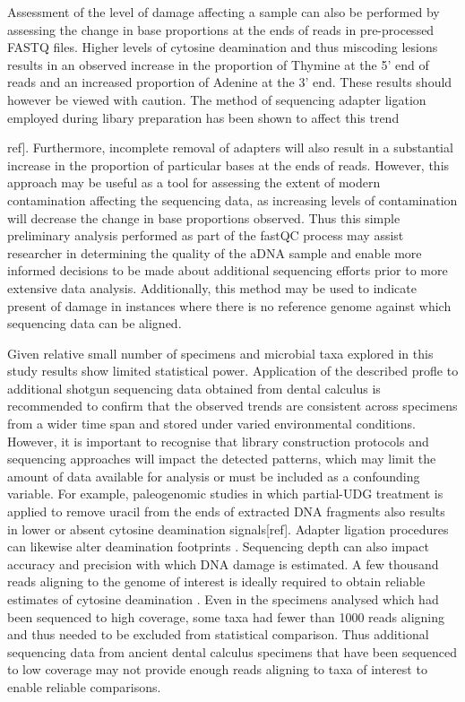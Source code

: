 \documentclass[12pt, a4paper]{article}
\begin{document}
Assessment of the level of damage affecting a sample can also be performed by assessing the change in base proportions at the ends of reads in pre-processed FASTQ files.
Higher levels of cytosine deamination and thus miscoding lesions results in an observed increase in the proportion of Thymine at the 5' end of reads and an increased proportion of Adenine at the 3' end.
These results should however be viewed with caution.
The method of sequencing adapter ligation employed during libary preparation has been shown to affect this trend {ref].
Furthermore, incomplete removal of adapters will also result in a substantial increase in the proportion of particular bases at the ends of reads.
However, this approach may be useful as a tool for assessing the extent of modern contamination affecting the sequencing data, as increasing levels of contamination will decrease the change in base proportions observed.
Thus this simple preliminary analysis performed as part of the fastQC process may assist researcher in determining the quality of the aDNA sample and enable more informed decisions to be made about additional sequencing efforts prior to more extensive data analysis.
Additionally, this method may be used to indicate present of damage in instances where there is no reference genome against which sequencing data can be aligned.

Given relative small number of specimens and microbial taxa explored in this study results show limited statistical power.
Application of the described profle to additional shotgun sequencing data obtained from dental calculus is recommended to confirm that the observed trends are consistent across specimens from a wider time span and stored under varied environmental conditions. 
However, it is important to recognise that library construction protocols and sequencing approaches will impact the detected patterns, which may limit the amount of data available for analysis or must be included as a confounding variable. 
For example, paleogenomic studies in which partial-UDG treatment is applied to remove uracil from the ends of extracted DNA fragments also results in lower or absent cytosine deamination signals[ref].
Adapter ligation procedures can likewise alter deamination footprints \cite{Seguin-Orlando:2013aa}.
Sequencing depth can also impact accuracy and precision with which DNA damage is estimated.
A few thousand reads aligning to the genome of interest is ideally required to obtain reliable estimates of cytosine deamination \cite{Warinner:2017aa}. 
Even in the specimens analysed which had been sequenced to high coverage, some taxa had fewer than 1000 reads aligning and thus needed to be excluded from statistical comparison. 
Thus additional sequencing data from ancient dental calculus specimens that have been sequenced to low coverage may not provide enough reads aligning to taxa of interest to enable reliable comparisons.

}
\end{document}

